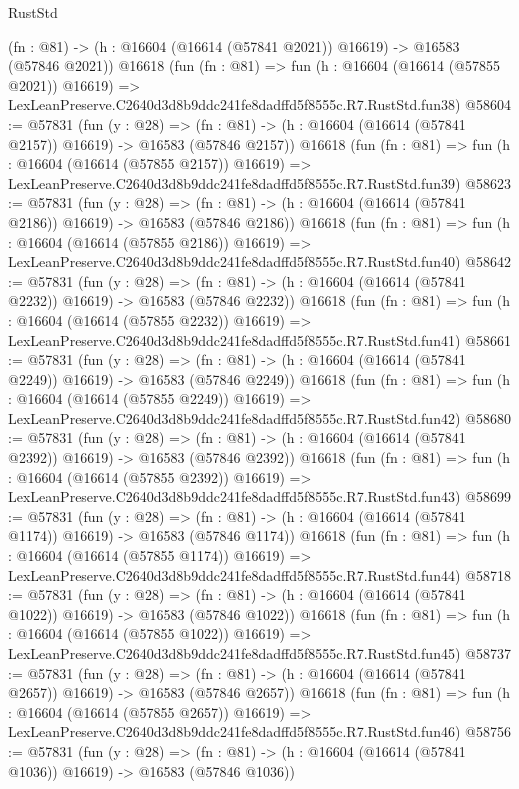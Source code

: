 \begin{lexlean}{RustStd}
\begin{coremodule}
    (fn : @81) -> (h : @16604 (@16614 (@57841 @2021)) @16619) -> @16583 (@57846 @2021))
    @16618
    (fun (fn : @81) =>
    fun (h : @16604 (@16614 (@57855 @2021)) @16619) =>
    LexLeanPreserve.C2640d3d8b9ddc241fe8dadffd5f8555c.R7.RustStd.fun38)
@58604 := @57831
    (fun (y : @28) =>
    (fn : @81) -> (h : @16604 (@16614 (@57841 @2157)) @16619) -> @16583 (@57846 @2157))
    @16618
    (fun (fn : @81) =>
    fun (h : @16604 (@16614 (@57855 @2157)) @16619) =>
    LexLeanPreserve.C2640d3d8b9ddc241fe8dadffd5f8555c.R7.RustStd.fun39)
@58623 := @57831
    (fun (y : @28) =>
    (fn : @81) -> (h : @16604 (@16614 (@57841 @2186)) @16619) -> @16583 (@57846 @2186))
    @16618
    (fun (fn : @81) =>
    fun (h : @16604 (@16614 (@57855 @2186)) @16619) =>
    LexLeanPreserve.C2640d3d8b9ddc241fe8dadffd5f8555c.R7.RustStd.fun40)
@58642 := @57831
    (fun (y : @28) =>
    (fn : @81) -> (h : @16604 (@16614 (@57841 @2232)) @16619) -> @16583 (@57846 @2232))
    @16618
    (fun (fn : @81) =>
    fun (h : @16604 (@16614 (@57855 @2232)) @16619) =>
    LexLeanPreserve.C2640d3d8b9ddc241fe8dadffd5f8555c.R7.RustStd.fun41)
@58661 := @57831
    (fun (y : @28) =>
    (fn : @81) -> (h : @16604 (@16614 (@57841 @2249)) @16619) -> @16583 (@57846 @2249))
    @16618
    (fun (fn : @81) =>
    fun (h : @16604 (@16614 (@57855 @2249)) @16619) =>
    LexLeanPreserve.C2640d3d8b9ddc241fe8dadffd5f8555c.R7.RustStd.fun42)
@58680 := @57831
    (fun (y : @28) =>
    (fn : @81) -> (h : @16604 (@16614 (@57841 @2392)) @16619) -> @16583 (@57846 @2392))
    @16618
    (fun (fn : @81) =>
    fun (h : @16604 (@16614 (@57855 @2392)) @16619) =>
    LexLeanPreserve.C2640d3d8b9ddc241fe8dadffd5f8555c.R7.RustStd.fun43)
@58699 := @57831
    (fun (y : @28) =>
    (fn : @81) -> (h : @16604 (@16614 (@57841 @1174)) @16619) -> @16583 (@57846 @1174))
    @16618
    (fun (fn : @81) =>
    fun (h : @16604 (@16614 (@57855 @1174)) @16619) =>
    LexLeanPreserve.C2640d3d8b9ddc241fe8dadffd5f8555c.R7.RustStd.fun44)
@58718 := @57831
    (fun (y : @28) =>
    (fn : @81) -> (h : @16604 (@16614 (@57841 @1022)) @16619) -> @16583 (@57846 @1022))
    @16618
    (fun (fn : @81) =>
    fun (h : @16604 (@16614 (@57855 @1022)) @16619) =>
    LexLeanPreserve.C2640d3d8b9ddc241fe8dadffd5f8555c.R7.RustStd.fun45)
@58737 := @57831
    (fun (y : @28) =>
    (fn : @81) -> (h : @16604 (@16614 (@57841 @2657)) @16619) -> @16583 (@57846 @2657))
    @16618
    (fun (fn : @81) =>
    fun (h : @16604 (@16614 (@57855 @2657)) @16619) =>
    LexLeanPreserve.C2640d3d8b9ddc241fe8dadffd5f8555c.R7.RustStd.fun46)
@58756 := @57831
    (fun (y : @28) =>
    (fn : @81) -> (h : @16604 (@16614 (@57841 @1036)) @16619) -> @16583 (@57846 @1036))

\end{coremodule}
\end{lexlean}
